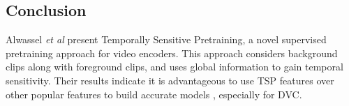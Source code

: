 \subsection{Conclusion}
Alwassel \textit{et al} present Temporally Sensitive Pretraining, a novel supervised pretraining approach for video encoders. This approach considers background clips along with foreground clips, and uses global information to gain temporal sensitivity. Their results indicate it is advantageous to use TSP features over other popular features to build accurate models \cite{alwassel2021tsp}, especially for DVC.